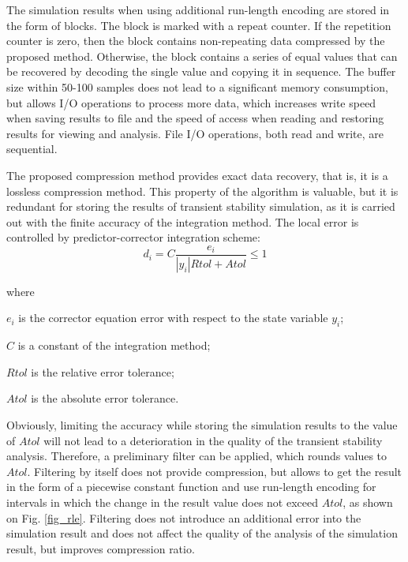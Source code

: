 \documentclass[lettersize,journal]{IEEEtran}
\begin{document}
The simulation results when using additional run-length encoding are stored in the form of blocks. 
The block is marked with a repeat counter. If the repetition counter is zero, then the block contains non-repeating 
data compressed by the proposed method. Otherwise, the block contains a series of equal values that can be recovered 
by decoding the single value and copying it in sequence. The buffer size within 50-100 samples does not lead to a significant memory consumption, but allows I/O operations to process more data, which increases write speed when saving results to file
and the speed of access when reading and restoring results for viewing and analysis. 
File I/O operations, both read and write, are sequential.

The proposed compression method provides exact data recovery, that is, it is a lossless compression method. 
This property of the algorithm is valuable, but it is redundant for storing the results of 
transient stability simulation, as it is carried out with the finite accuracy of the integration method. 
The local error is controlled by predictor-corrector integration scheme:
\begin{equation}
	\label{eqn_interror}
	d_i=C\frac{e_i}{|y_i|Rtol+Atol} \leq 1
\end{equation}

\noindent where
\begin{description}
	\item  \(e_i\) is the corrector equation error with respect to the 
	state variable \(y_i\);
	\item  \(C\) is a constant of the integration method;
	\item  \(Rtol\) is the relative error tolerance;
	\item  \(Atol\) is the absolute error tolerance.
\end{description}

Obviously, limiting the accuracy while storing the simulation results 
to the value of \(Atol\) will not lead to a deterioration in the quality of the transient stability analysis. 
Therefore, a preliminary filter can be applied, which rounds values to \(Atol\). 
Filtering by itself does not provide compression, but allows to get the result in the form of a piecewise
constant function and use run-length encoding for intervals in which the change in the result value does not exceed \(Atol\), as shown on Fig. \ref{fig_rle}. 
Filtering does not introduce an additional error into the simulation 
result and does not affect the quality of the analysis of the simulation result, but improves compression ratio.
\end{document}
